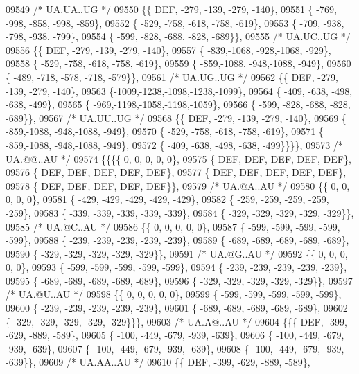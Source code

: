 \begin{DoxyCode}
09549 \textcolor{comment}{/* UA.UA..UG */}
09550 \{\{  DEF, -279, -139, -279, -140\},
09551 \{ -769, -998, -858, -998, -859\},
09552 \{ -529, -758, -618, -758, -619\},
09553 \{ -709, -938, -798, -938, -799\},
09554 \{ -599, -828, -688, -828, -689\}\},
09555 \textcolor{comment}{/* UA.UC..UG */}
09556 \{\{  DEF, -279, -139, -279, -140\},
09557 \{ -839,-1068, -928,-1068, -929\},
09558 \{ -529, -758, -618, -758, -619\},
09559 \{ -859,-1088, -948,-1088, -949\},
09560 \{ -489, -718, -578, -718, -579\}\},
09561 \textcolor{comment}{/* UA.UG..UG */}
09562 \{\{  DEF, -279, -139, -279, -140\},
09563 \{-1009,-1238,-1098,-1238,-1099\},
09564 \{ -409, -638, -498, -638, -499\},
09565 \{ -969,-1198,-1058,-1198,-1059\},
09566 \{ -599, -828, -688, -828, -689\}\},
09567 \textcolor{comment}{/* UA.UU..UG */}
09568 \{\{  DEF, -279, -139, -279, -140\},
09569 \{ -859,-1088, -948,-1088, -949\},
09570 \{ -529, -758, -618, -758, -619\},
09571 \{ -859,-1088, -948,-1088, -949\},
09572 \{ -409, -638, -498, -638, -499\}\}\}\},
09573 \textcolor{comment}{/* UA.@@..AU */}
09574 \{\{\{\{    0,    0,    0,    0,    0\},
09575 \{  DEF,  DEF,  DEF,  DEF,  DEF\},
09576 \{  DEF,  DEF,  DEF,  DEF,  DEF\},
09577 \{  DEF,  DEF,  DEF,  DEF,  DEF\},
09578 \{  DEF,  DEF,  DEF,  DEF,  DEF\}\},
09579 \textcolor{comment}{/* UA.@A..AU */}
09580 \{\{    0,    0,    0,    0,    0\},
09581 \{ -429, -429, -429, -429, -429\},
09582 \{ -259, -259, -259, -259, -259\},
09583 \{ -339, -339, -339, -339, -339\},
09584 \{ -329, -329, -329, -329, -329\}\},
09585 \textcolor{comment}{/* UA.@C..AU */}
09586 \{\{    0,    0,    0,    0,    0\},
09587 \{ -599, -599, -599, -599, -599\},
09588 \{ -239, -239, -239, -239, -239\},
09589 \{ -689, -689, -689, -689, -689\},
09590 \{ -329, -329, -329, -329, -329\}\},
09591 \textcolor{comment}{/* UA.@G..AU */}
09592 \{\{    0,    0,    0,    0,    0\},
09593 \{ -599, -599, -599, -599, -599\},
09594 \{ -239, -239, -239, -239, -239\},
09595 \{ -689, -689, -689, -689, -689\},
09596 \{ -329, -329, -329, -329, -329\}\},
09597 \textcolor{comment}{/* UA.@U..AU */}
09598 \{\{    0,    0,    0,    0,    0\},
09599 \{ -599, -599, -599, -599, -599\},
09600 \{ -239, -239, -239, -239, -239\},
09601 \{ -689, -689, -689, -689, -689\},
09602 \{ -329, -329, -329, -329, -329\}\}\},
09603 \textcolor{comment}{/* UA.A@..AU */}
09604 \{\{\{  DEF, -399, -629, -889, -589\},
09605 \{ -100, -449, -679, -939, -639\},
09606 \{ -100, -449, -679, -939, -639\},
09607 \{ -100, -449, -679, -939, -639\},
09608 \{ -100, -449, -679, -939, -639\}\},
09609 \textcolor{comment}{/* UA.AA..AU */}
09610 \{\{  DEF, -399, -629, -889, -589\},

\end{DoxyCode}
